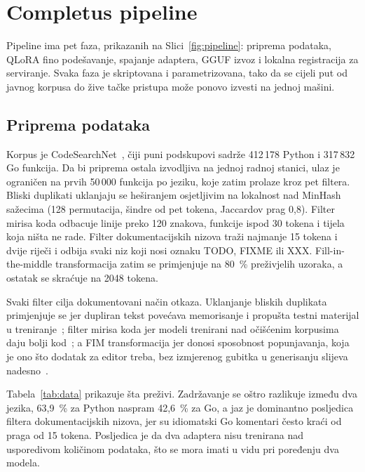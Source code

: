 \documentclass[10pt,conference,a4paper]{IEEEtran}
\begin{document}
\section{Completus pipeline}
Pipeline ima pet faza, prikazanih na Slici~\ref{fig:pipeline}: priprema
podataka, QLoRA fino podešavanje, spajanje adaptera, GGUF izvoz i lokalna
registracija za serviranje. Svaka faza je skriptovana i parametrizovana, tako
da se cijeli put od javnog korpusa do žive tačke pristupa može ponovo izvesti
na jednoj mašini.

\subsection{Priprema podataka}
\label{sec:data}
Korpus je CodeSearchNet~\cite{husain2019}, čiji puni podskupovi sadrže
412\,178 Python i 317\,832 Go funkcija. Da bi priprema ostala izvodljiva na
jednoj radnoj stanici, ulaz je ograničen na prvih 50\,000 funkcija po jeziku,
koje zatim prolaze kroz pet filtera. Bliski duplikati uklanjaju se heširanjem osjetljivim
na lokalnost nad MinHash sažecima (128 permutacija, šindre od pet tokena,
Jaccardov prag 0,8). Filter mirisa koda odbacuje linije preko 120 znakova,
funkcije ispod 30 tokena i tijela koja ništa ne rade. Filter
dokumentacijskih nizova traži najmanje 15 tokena i dvije riječi i odbija
svaki niz koji nosi oznaku TODO, FIXME ili XXX. Fill-in-the-middle
transformacija zatim se primjenjuje na 80~\% preživjelih uzoraka, a ostatak
se skraćuje na 2048 tokena.

Svaki filter cilja dokumentovani način otkaza. Uklanjanje bliskih duplikata
primjenjuje se jer dupliran tekst povećava memorisanje i propušta testni
materijal u treniranje~\cite{lee2022}; filter
mirisa koda jer modeli trenirani nad očišćenim korpusima daju bolji
kod~\cite{xue2025}; a FIM transformacija jer donosi sposobnost popunjavanja,
koja je ono što dodatak za editor treba, bez izmjerenog gubitka u generisanju
slijeva nadesno~\cite{bavarian2022}.

Tabela~\ref{tab:data} prikazuje šta preživi. Zadržavanje se oštro razlikuje
između dva jezika, 63,9~\% za Python naspram 42,6~\% za Go, a jaz je
dominantno posljedica filtera dokumentacijskih nizova, jer su idiomatski Go
komentari često kraći od praga od 15 tokena. Posljedica je da dva adaptera
nisu trenirana nad usporedivom količinom podataka, što se mora imati u vidu
pri poređenju dva modela.
\end{document}
